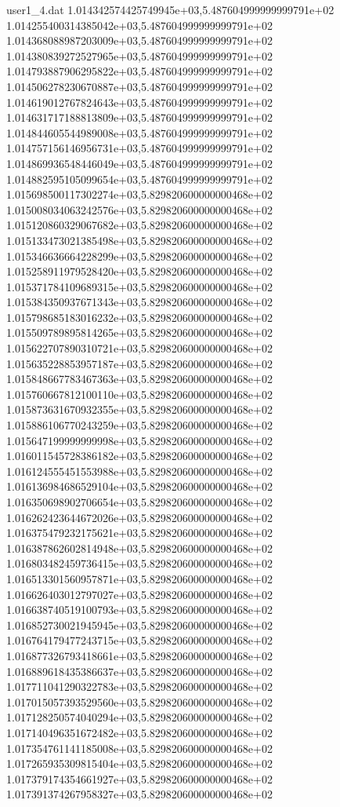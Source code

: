 \begin{filecontents}{user1_4.dat}
1.014342574425749945e+03,5.487604999999999791e+02
1.014255400314385042e+03,5.487604999999999791e+02
1.014368088987203009e+03,5.487604999999999791e+02
1.014380839272527965e+03,5.487604999999999791e+02
1.014793887906295822e+03,5.487604999999999791e+02
1.014506278230670887e+03,5.487604999999999791e+02
1.014619012767824643e+03,5.487604999999999791e+02
1.014631717188813809e+03,5.487604999999999791e+02
1.014844605544989008e+03,5.487604999999999791e+02
1.014757156146956731e+03,5.487604999999999791e+02
1.014869936548446049e+03,5.487604999999999791e+02
1.014882595105099654e+03,5.487604999999999791e+02
1.015698500117302274e+03,5.829820600000000468e+02
1.015008034063242576e+03,5.829820600000000468e+02
1.015120860329067682e+03,5.829820600000000468e+02
1.015133473021385498e+03,5.829820600000000468e+02
1.015346636664228299e+03,5.829820600000000468e+02
1.015258911979528420e+03,5.829820600000000468e+02
1.015371784109689315e+03,5.829820600000000468e+02
1.015384350937671343e+03,5.829820600000000468e+02
1.015798685183016232e+03,5.829820600000000468e+02
1.015509789895814265e+03,5.829820600000000468e+02
1.015622707890310721e+03,5.829820600000000468e+02
1.015635228853957187e+03,5.829820600000000468e+02
1.015848667783467363e+03,5.829820600000000468e+02
1.015760667812100110e+03,5.829820600000000468e+02
1.015873631670932355e+03,5.829820600000000468e+02
1.015886106770243259e+03,5.829820600000000468e+02
1.015647199999999998e+03,5.829820600000000468e+02
1.016011545728386182e+03,5.829820600000000468e+02
1.016124555451553988e+03,5.829820600000000468e+02
1.016136984686529104e+03,5.829820600000000468e+02
1.016350698902706654e+03,5.829820600000000468e+02
1.016262423644672026e+03,5.829820600000000468e+02
1.016375479232175621e+03,5.829820600000000468e+02
1.016387862602814948e+03,5.829820600000000468e+02
1.016803482459736415e+03,5.829820600000000468e+02
1.016513301560957871e+03,5.829820600000000468e+02
1.016626403012797027e+03,5.829820600000000468e+02
1.016638740519100793e+03,5.829820600000000468e+02
1.016852730021945945e+03,5.829820600000000468e+02
1.016764179477243715e+03,5.829820600000000468e+02
1.016877326793418661e+03,5.829820600000000468e+02
1.016889618435386637e+03,5.829820600000000468e+02
1.017711041290322783e+03,5.829820600000000468e+02
1.017015057393529560e+03,5.829820600000000468e+02
1.017128250574040294e+03,5.829820600000000468e+02
1.017140496351672482e+03,5.829820600000000468e+02
1.017354761141185008e+03,5.829820600000000468e+02
1.017265935309815404e+03,5.829820600000000468e+02
1.017379174354661927e+03,5.829820600000000468e+02
1.017391374267958327e+03,5.829820600000000468e+02

\end{filecontents}
